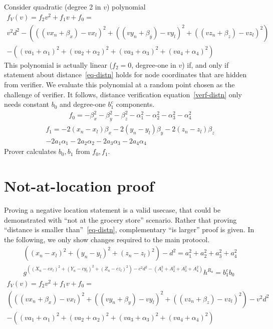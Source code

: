 \documentclass[a4paper,12pt]{article}
\begin{document}
Consider quadratic (degree 2 in $v$) polynomial
\begin{multline}
  f_V(v) = f_2 v^2 + f_1 v + f_0 = \\
  v^2 d^2 - (((v x_n + \beta_x) - v x_l)^2 +
           ((v y_n + \beta_y) - v y_l)^2 +
           ((v z_n + \beta_z) - v z_l)^2)  \\
        - ((v a_1 + \alpha_1)^2 +
           (v a_2 + \alpha_2)^2 +
           (v a_3 + \alpha_3)^2 +
           (v a_4 + \alpha_4)^2)
\end{multline}
This polynomial is actually linear ($f_2 = 0$, degree-one in $v$)
if, and only if
statement about distance~\eqref{eq-distn} holds for node coordinates that are hidden from verifier.
We evaluate this polynomial at a random point chosen as the challenge of verifier.
It follows, distance verification equation~\eqref{verf-distn}
only needs constant $b_0$ and degree-one $b_1^c$ components.
\begin{gather}
  f_0 = -\beta_x^2 - \beta_y^2 - \beta_z^2 - \alpha_1^2 - \alpha_2^2 - \alpha_3^2 - \alpha_4^2
\end{gather}
\begin{multline}
  f_1 = -2 (x_n - x_l) \beta_x  -2 (y_n - y_l) \beta_y  -2 (z_n - z_l) \beta_z \\
        -2 a_1 \alpha_1 -2 a_2 \alpha_2 -2 a_3 \alpha_3 -2 a_4 \alpha_4
\end{multline}
Prover calculates $b_0, b_1$ from $f_0, f_1$.

\section{Not-at-location proof}

Proving a negative location statement is a valid usecase,
that could be demonstrated with ``not at the grocery store'' scenario.
Rather that proving ``distance is smaller than''~\eqref{eq-distn},
complementary ``is larger'' proof is given. %
In the following, we only show changes required to the main protocol.
\begin{gather}
\label{eq-distn-more}
  ((x_n - x_l)^2 + (y_n - y_l)^2 + (z_n - z_l)^2) - d^2 = a_1^2 + a_2^2 + a_3^2 + a_4^2  \\
\label{verf-distn-more}
  g^{((X_n - c x_l)^2 + (Y_n - c y_l)^2 + (Z_n - c z_l)^2 ) - c^2 d^2 - (A_1^2 + A_2^2 + A_3^2 + A_4^2)} h^{R_a} = b_1^{c} b_0 
\end{gather}
\begin{multline}
\label{eq-coeff-more}
  f_V(v) = f_2 v^2 + f_1 v + f_0 = \\
  (((v x_n + \beta_x) - v x_l)^2 +
   ((v y_n + \beta_y) - v y_l)^2 +
   ((v z_n + \beta_z) - v z_l)^2)
  - v^2 d^2 \\
  - ((v a_1 + \alpha_1)^2 +
     (v a_2 + \alpha_2)^2 +
     (v a_3 + \alpha_3)^2 +
     (v a_4 + \alpha_4)^2)
\end{multline}
\end{document}
